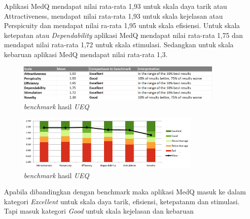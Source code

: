 Aplikasi MedQ mendapat nilai rata-rata 1,93 untuk skala daya tarik atau 
Attractiveness, mendapat nilai rata-rata 1,93 untuk skala kejelasan atau 
Perspicuity dan mendapat nilai ra-rata 1,95 untuk skala efisiensi. Untuk skala 
ketepatan atau \textit{Dependability} aplikasi MedQ mendapat nilai rata-rata 1,75 dan 
mendapat nilai rata-rata 1,72 untuk skala stimulasi. Sedangkan untuk skala 
kebaruan aplikasi MedQ mendapat nilai rata-rata 1,3. 
\begin{figure}[H]
	\centering
	\includegraphics[width=0.9\textwidth]{contents/chapter-4/images/BenchMark.png}
	\caption{\textit{benchmark} hasil \textit{UEQ}}
	\label{Fig : benchmark}
\end{figure}
\begin{figure}[H]
	\centering
	\includegraphics[width=0.8\textwidth]{contents/chapter-4/images/BenchMark-graph.png}
	\caption{\textit{benchmark} hasil \textit{UEQ}}
	\label{Fig : benchmark-graph}
\end{figure}
Apabila dibandingkan dengan benchmark maka aplikasi MedQ masuk ke 
dalam kategori \textit{Excellent} untuk skala daya tarik, efisiensi, ketepatanm dan stimulasi.
Tapi masuk kategori \textit{Good} untuk skala kejelasan dan kebaruan